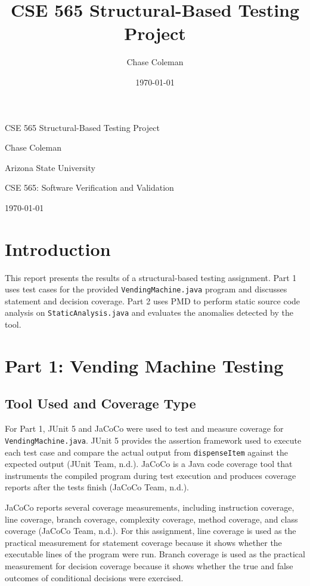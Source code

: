 \documentclass[12pt]{article}
\title{CSE 565 Structural-Based Testing Project}
\author{Chase Coleman}
\date{\today}
\begin{document}
\begin{titlepage}
    \centering
    \vspace*{1.5in}
    {\Large CSE 565 Structural-Based Testing Project\par}
    \vspace{0.75in}
    Chase Coleman\par
    Arizona State University\par
    CSE 565: Software Verification and Validation\par
    \vspace{0.75in}
    \today\par
\end{titlepage}

\setcounter{page}{2}
\doublespacing

\section{Introduction}

This report presents the results of a structural-based testing assignment. Part 1 uses test cases for the provided \texttt{VendingMachine.java} program and discusses statement and decision coverage. Part 2 uses PMD to perform static source code analysis on \texttt{StaticAnalysis.java} and evaluates the anomalies detected by the tool.

\section{Part 1: Vending Machine Testing}

\subsection{Tool Used and Coverage Type}

For Part 1, JUnit 5 and JaCoCo were used to test and measure coverage for \texttt{VendingMachine.java}. JUnit 5 provides the assertion framework used to execute each test case and compare the actual output from \texttt{dispenseItem} against the expected output (JUnit Team, n.d.). JaCoCo is a Java code coverage tool that instruments the compiled program during test execution and produces coverage reports after the tests finish (JaCoCo Team, n.d.).

JaCoCo reports several coverage measurements, including instruction coverage, line coverage, branch coverage, complexity coverage, method coverage, and class coverage (JaCoCo Team, n.d.). For this assignment, line coverage is used as the practical measurement for statement coverage because it shows whether the executable lines of the program were run. Branch coverage is used as the practical measurement for decision coverage because it shows whether the true and false outcomes of conditional decisions were exercised.
\end{document}
